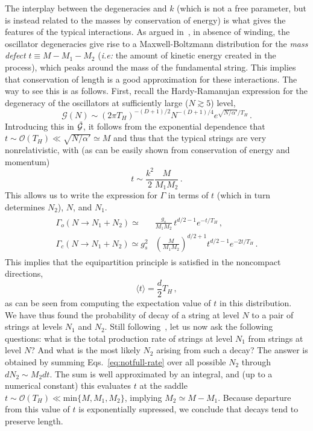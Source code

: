 \documentclass[a4paper,11pt]{article}
\newcommand{\lr}[1]{\left(#1\right)}
\begin{document}
The interplay between the degeneracies and $k$ (which is not a free parameter, but is instead related to the masses by conservation of energy) is what gives the features of the typical interactions.
As argued in~\cite{Manes:2001cs}, in absence of winding, the oscillator degeneracies give rise to a Maxwell-Boltzmann distribution for the \textit{mass defect} $t\equiv M-M_1-M_2$ (\textit{i.e:} the amount of kinetic energy created in the process), which peaks around the mass of the fundamental string. 
This implies that conservation of length is a good approximation for these interactions.
The way to see this is as follows. 
First, recall the Hardy-Ramanujan expression for the degeneracy of the oscillators at sufficiently large ($N\gtrsim 5$) level,
\begin{equation}
    \mathcal{G}(N)\sim (2\pi T_H)^{-(D+1)/2}N^{-(D+1)/4}e^{\sqrt{N/\alpha '}/ T_H}\, .
\end{equation}
Introducing this in $\Tilde{\mathcal{G}}$, it follows from the exponential dependence that $t\sim \mathcal{O}(T_H)\ll \sqrt{N/\alpha '}\simeq M$ and thus that the typical strings are very nonrelativistic, with (as can be easily shown from conservation of energy and momentum) 
\begin{equation}
    t\sim \frac{k^2}{2}\frac{M}{M_1 M_2}\, .
\end{equation}
This allows us to write the expression for $\Gamma$ in terms of $t$ (which in turn determines $N_2$), $N$, and $N_1$.
\begin{gather}\label{eq:notfull-rate}
\begin{split}
    \Gamma_o\lr{N \rightarrow N_1+N_2}\simeq & \frac{g_s}{M_1 M_2}\, t^{d/2-1}e^{-t/T_H} \, , \\
    \Gamma_{c}\lr{N \rightarrow N_1+N_2}\simeq g_s^2 & \lr{\frac{M}{M_1M_2}}^{d/2+1}t^{d/2-1}e^{-2t/T_H} \, .
\end{split}
\end{gather}
This implies that the equipartition principle is satisfied in the noncompact directions,
\begin{equation}
    \langle t\rangle=\frac{d}{2}T_H\, ,
\end{equation}
as can be seen from computing the expectation value of $t$ in this distribution.
\\

We have thus found the probability of decay of a string at level $N$ to a pair of strings at levels $N_1$ and $N_2$.
Still following~\cite{Manes:2001cs}, let us now ask the following questions: what is the total production rate of strings at level $N_1$ from strings at level $N$?
And what is the most likely $N_2$ arising from such a decay?
The answer is obtained by summing Eqs.~\eqref{eq:notfull-rate} over all possible $N_2$ through $dN_2\sim M_2dt$.
The sum is well approximated by an integral, and (up to a numerical constant) this evaluates $t$ at the saddle $t\sim \mathcal{O}(T_H)\ll \text{min}\lbrace M,M_1,M_2\rbrace$, implying $M_2\simeq M-M_1$.
Because departure from this value of $t$ is exponentially supressed, we conclude that decays tend to preserve length.
\end{document}
